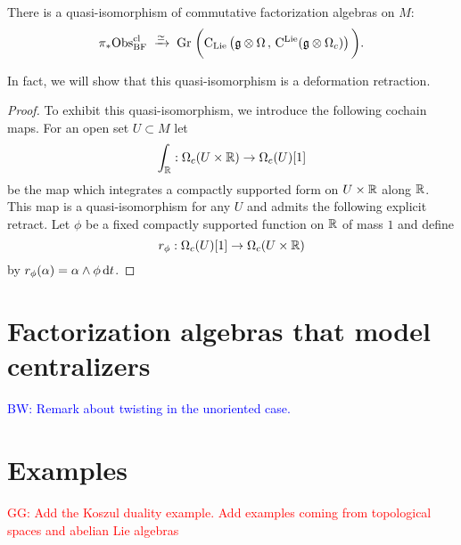 \documentclass[11pt]{amsart}
\numberwithin{equation}{section}
\def\brian{\textcolor{blue}{BW: }\textcolor{blue}}
\def\greg{\textcolor{red}{GG: }\textcolor{red}}
\begin{document}
 \begin{lmm}
There is a quasi-isomorphism of commutative factorization algebras on $M$:
\[
\pi_* {\rm Obs}^{\rm cl}_{\rm BF} \; \xrightarrow{\simeq} \; {\rm Gr} \; \bigg({\rm C}_{{\rm Lie}}\left(\mathfrak g \otimes \Omega \, , \, {\rm C}^{\rm Lie} (\mathfrak g \otimes \Omega_c) \right) \bigg) .
\]
\end{lmm}

In fact, we will show that this quasi-isomorphism is a deformation retraction. 

\begin{proof}
To exhibit this quasi-isomorphism, we introduce the following cochain maps.
For an open set $U \subset M$ let
\[
\int_\mathbb R : \Omega_c(U \times \mathbb R) \to \Omega_c (U) [1] 
\] 
be the map which integrates a compactly supported form on $U \times \mathbb R$ along $\mathbb R$. 
This map is a quasi-isomorphism for any $U $ and admits the following explicit retract. 
Let $\phi$ be a fixed compactly supported function on $\mathbb R$ of mass $1$ and define
\[
r_\phi : \Omega_c(U) [1] \to \Omega_c (U \times \mathbb R)
\]
by $r_\phi (\alpha) = \alpha \wedge \phi \, {\rm d} t$. 
\end{proof}

%
%

\section{Factorization algebras that model centralizers}

\brian{Remark about twisting in the unoriented case.}

\section{Examples}


\greg{Add the Koszul duality example. Add examples coming from topological spaces and abelian Lie algebras}
\end{document}
